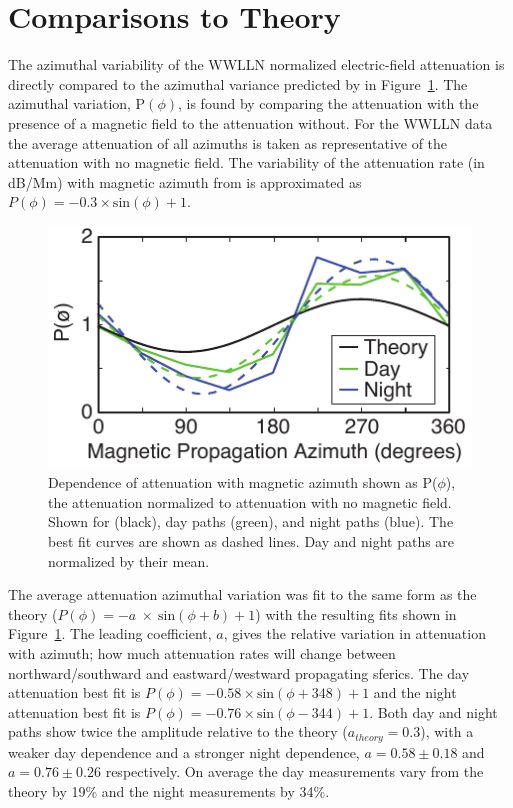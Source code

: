 \section{Comparisons to Theory}

The azimuthal variability of the WWLLN normalized electric-field attenuation is directly compared to the azimuthal variance predicted by \citet{Wait1960a} in Figure~\ref{azimuth:fig:attenuationTheory}.
The azimuthal variation, P$(\phi)$, is found by comparing the attenuation with the presence of a magnetic field to the attenuation without.
For the WWLLN data the average attenuation of all azimuths is taken as representative of the attenuation with no magnetic field.
The variability of the attenuation rate (in dB/Mm) with magnetic azimuth from \citet{Wait1960a} is approximated as $P(\phi) = - 0.3 \times \text{sin}(\phi) + 1$.

\begin{figure}[h!t]
   \centering
   \includegraphics[scale=1]{Azimuth/Figures/attenuationTheory.pdf} 
   \caption{Dependence of attenuation with magnetic azimuth shown as P($\phi$), the attenuation normalized to attenuation with no magnetic field.
   	Shown for \citet{Wait1960a} (black), day paths (green), and night paths (blue).
	The best fit curves are shown as dashed lines.
	Day and night paths are normalized by their mean.}
   \label{azimuth:fig:attenuationTheory}
\end{figure}

The average attenuation azimuthal variation was fit to the same form as the theory ($P(\phi) = - a~\times~\text{sin}(\phi + b) + 1$) with the resulting fits shown in Figure~\ref{azimuth:fig:attenuationTheory}.
The leading coefficient, $a$, gives the relative variation in attenuation with azimuth; how much attenuation rates will change between northward/southward and eastward/westward propagating sferics.
The day attenuation best fit is $P(\phi) = - 0.58 \times \text{sin}(\phi + 348) + 1$ and the night attenuation best fit is $P(\phi) = - 0.76 \times \text{sin}(\phi - 344) + 1$.
Both day and night paths show twice the amplitude relative to the theory ($a_{theory} = 0.3$), with a weaker day dependence and a stronger night dependence, $a=0.58 \pm 0.18$ and $a=0.76 \pm 0.26$ respectively.
On average the day measurements vary from the theory by 19\% and the night measurements by 34\%.

